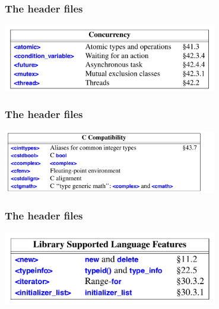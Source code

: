 \begin{frame}
  \frametitle{The header files}
  \centering
  \includegraphics[width=0.7\textwidth]{img/head_10.png}
\end{frame}
\begin{frame}
  \frametitle{The header files}
  \centering
  \includegraphics[width=0.7\textwidth]{img/head_11.png}
\end{frame}
\begin{frame}
  \frametitle{The header files}
  \centering
  \includegraphics[width=0.7\textwidth]{img/head_12.png}
\end{frame}
